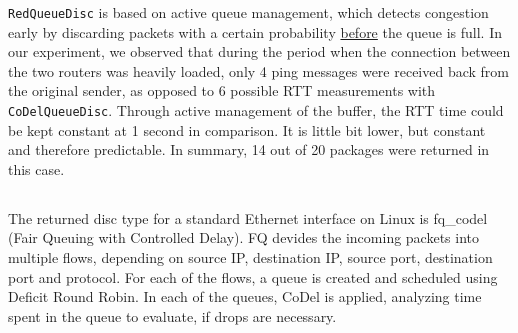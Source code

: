 \documentclass{article}
\begin{document}

    \texttt{RedQueueDisc} is based on active queue management, which detects congestion early by discarding packets with a certain probability \underline{before} the queue is full. In our experiment, we observed that during the period when the connection between the two routers was heavily loaded, only 4 ping messages were received back from the original sender, as opposed to 6 possible RTT measurements with \texttt{CoDelQueueDisc}. Through active management of the buffer, the RTT time could be kept constant at 1 second in comparison. It is little bit lower, but constant and therefore predictable. In summary, 14 out of 20 packages were returned in this case.

    

    \newpage
        
    \subsection{}
    The returned disc type for a standard Ethernet interface on Linux is fq\_codel (Fair Queuing with Controlled Delay). FQ devides the incoming packets into multiple flows, depending on source IP, destination IP, source port, destination port and protocol. For each of the flows, a queue is created and scheduled using Deficit Round Robin. In each of the queues, CoDel is applied, analyzing time spent in the queue to evaluate, if drops are necessary. \cite{ns3-fqcodel} \cite{tc-fq_codel-manpage}

    
    
    
\end{document}
